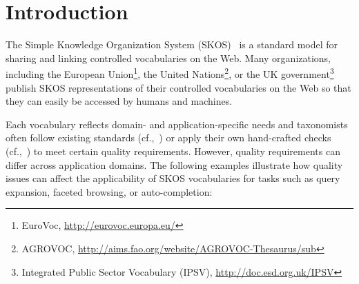 
\section{Introduction}\label{sec:introduction}


The Simple Knowledge Organization System (SKOS)~\cite{Miles2005} is a standard model for sharing and linking controlled vocabularies on the Web. Many organizations, including the European Union\footnote{EuroVoc, \url{http://eurovoc.europa.eu/}}, the United Nations\footnote{AGROVOC, \url{http://aims.fao.org/website/AGROVOC-Thesaurus/sub}}, or the UK government\footnote{Integrated Public Sector Vocabulary (IPSV), \url{http://doc.esd.org.uk/IPSV}} publish SKOS representations of their controlled vocabularies on the Web so that they can easily be accessed by humans and machines.

Each vocabulary reflects domain- and application-specific needs and taxonomists often follow existing standards (cf.,~\cite{ISO25964-1:2011,Z39.19:2005}) or apply their own hand-crafted checks (cf.,~\cite{Coronado2009}) to meet certain quality requirements. However, quality requirements can differ across application domains. The following examples illustrate how quality issues can affect the applicability of SKOS vocabularies for tasks such as query expansion, faceted browsing, or auto-completion: 

